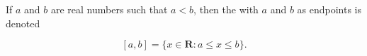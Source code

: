 If $a$ and $b$ are real numbers such that $a < b$, then the  with $a$ and $b$ as endpoints is denoted

$$[a, b] = \{x \in \mathbf{R} : a \leq x \leq b\}.$$
